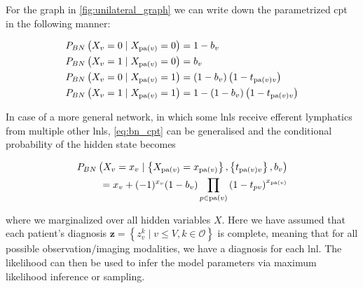 \documentclass[../ms.tex]{subfiles}
\begin{document}
For the graph in \cref{fig:unilateral_graph} we can write down the parametrized \gls{cpt} in the following manner:

\begin{equation} \label{eq:bn_cpt}
    \begin{aligned}
        P_{BN} \left( X_v = 0 \mid X_{\operatorname{pa}(v)} = 0 \right) &= 1 - b_v \\
        P_{BN} \left( X_v = 1 \mid X_{\operatorname{pa}(v)} = 0 \right) &= b_v \\
        P_{BN} \left( X_v = 0 \mid X_{\operatorname{pa}(v)} = 1 \right) &= (1 - b_v) \left(1 - t_{\operatorname{pa}(v)v}\right) \\
        P_{BN} \left( X_v = 1 \mid X_{\operatorname{pa}(v)} = 1 \right) &= 1 - (1 - b_v) \left(1 - t_{\operatorname{pa}(v)v}\right) 
    \end{aligned}
\end{equation}

In case of a more general network, in which some \glspl{lnl} receive efferent lymphatics from multiple other \glspl{lnl}, \cref{eq:bn_cpt} can be generalised and the conditional probability of the hidden state becomes

\begin{equation}
    \begin{aligned}
        P_{BN} \left( X_v = x_v \mid \left\{ X_{\operatorname{pa}(v)} = x_{\operatorname{pa}(v)} \right\}, \left\{ t_{\operatorname{pa}(v)v} \right\} , b_v \right) \\
        = x_v + (-1)^{x_v} (1 - b_v) \prod_{p \in \operatorname{pa}(v)}{\left( 1 - t_{pv} \right)}^{x_{\operatorname{pa}(v)}}
    \end{aligned}
\end{equation}

where we marginalized over all hidden variables $X$. Here we have assumed that each patient's diagnosis $\mathbf{z} = \left\{ z_v^k \mid v \leq V, k \in \mathcal{O} \right\}$ is complete, meaning that for all possible observation/imaging modalities, we have a diagnosis for each \gls{lnl}. The likelihood can then be used to infer the model parameters via maximum likelihood inference or sampling.
\end{document}
